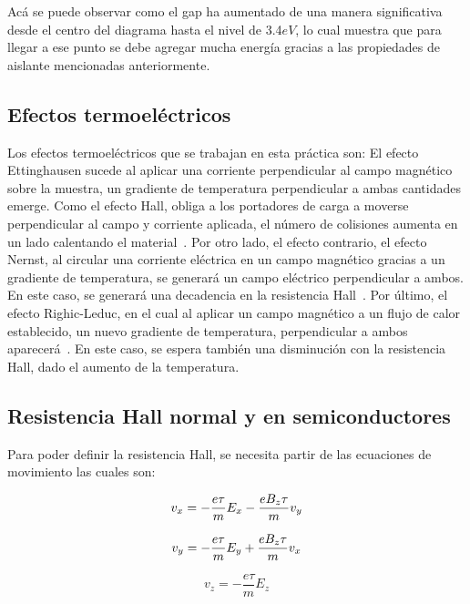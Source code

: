 \documentclass[%
 reprint,
 amsmath,amssymb,
 aps,
]{revtex4-1}
\begin{document}
Acá se puede observar como el gap ha aumentado de una manera significativa desde el centro del diagrama hasta el nivel de 3.4$eV$, lo cual muestra que para llegar a ese punto se debe agregar mucha energía gracias a las propiedades de aislante mencionadas anteriormente.

\subsection{Efectos termoeléctricos}

Los efectos termoeléctricos que se trabajan en esta práctica son: El efecto Ettinghausen sucede al aplicar una corriente perpendicular al campo magnético sobre la muestra, un gradiente de temperatura perpendicular a ambas cantidades emerge. Como el efecto Hall, obliga a los portadores de carga a moverse perpendicular al campo y corriente aplicada, el número de colisiones aumenta en un lado calentando el material~\cite{Nernst}. Por otro lado, el efecto contrario, el efecto Nernst, al circular una corriente eléctrica en un campo magnético gracias a un gradiente de temperatura, se generará un campo eléctrico perpendicular a ambos. En este caso, se generará una decadencia en la resistencia Hall~\cite{Nernst}. Por último, el efecto Righic-Leduc, en el cual al aplicar un campo magnético a un flujo de calor establecido, un nuevo gradiente de temperatura, perpendicular a ambos aparecerá~\cite{Righic}. En este caso, se espera también una disminución con la resistencia Hall, dado el aumento de la temperatura.

\subsection{Resistencia Hall normal y en semiconductores}

Para poder definir la resistencia Hall, se necesita partir de las ecuaciones de movimiento las cuales son:

\begin{equation}
    v_x=-\frac{e\tau}{m}E_x - \frac{eB_z\tau}{m}v_y \\
\end{equation}

\begin{equation}
    v_y=-\frac{e\tau}{m}E_y + \frac{eB_z\tau}{m}v_x \\
\end{equation}

\begin{equation}
      v_z=-\frac{e\tau}{m}E_z
\end{equation}
\end{document}
